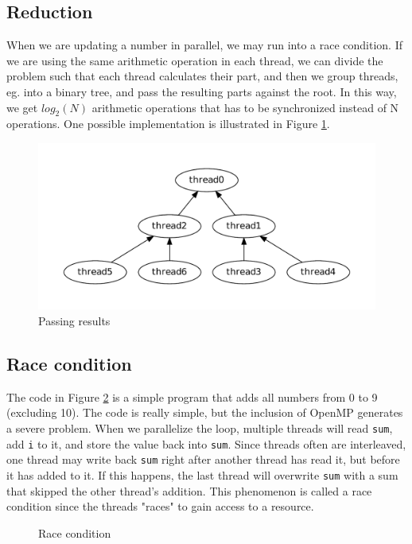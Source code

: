 \documentclass[english,a4paper,numbers=noenddot]{article}
\begin{document}
\subsection{Reduction}
When we are updating a number in parallel, we may run into a race condition. If we are using the same arithmetic operation in each thread, we can divide the problem such that each thread calculates their part, and then we group threads, eg. into a binary tree, and pass the resulting parts against the root. In this way, we get $log_2(N)$ arithmetic operations that has to be synchronized instead of N operations. One possible implementation is illustrated in Figure \ref{pr}.
\begin{figure}
    \includegraphics{reduction.pdf}
    \caption{Passing results}
    \label{pr}
\end{figure}

\subsection{Race condition}
The code in Figure \ref{rc} is a simple program that adds all numbers from 0 to 9 (excluding 10). The code is really simple, but the inclusion of OpenMP generates a severe problem. When we parallelize the loop, multiple threads will read \texttt{sum}, add \texttt{i} to it, and store the value back into \texttt{sum}. Since threads often are interleaved, one thread may write back \texttt{sum} right after another thread has read it, but before it has added to it. If this happens, the last thread will overwrite \texttt{sum} with a sum that skipped the other thread's addition. This phenomenon is called a race condition since the threads "races" to gain access to a resource.
\begin{figure}[caption={Race condition},captionpos=b]
    
    \caption{Race condition}
    \label{rc}
\end{figure}
\end{document}
